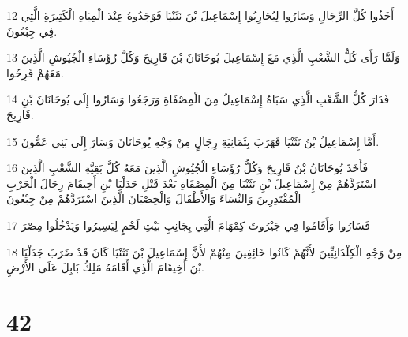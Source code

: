 \par 12 أَخَذُوا كُلَّ الرِّجَالِ وَسَارُوا لِيُحَارِبُوا إِسْمَاعِيلَ بْنَ نَثَنْيَا فَوَجَدُوهُ عِنْدَ الْمِيَاهِ الْكَثِيرَةِ الَّتِي فِي جِبْعُونَ.
\par 13 وَلَمَّا رَأَى كُلُّ الشَّعْبِ الَّذِي مَعَ إِسْمَاعِيلَ يُوحَانَانَ بْنَ قَارِيحَ وَكُلَّ رُؤَسَاءِ الْجُيُوشِ الَّذِينَ مَعَهُمْ فَرِحُوا.
\par 14 فَدَارَ كُلُّ الشَّعْبِ الَّذِي سَبَاهُ إِسْمَاعِيلُ مِنَ الْمِصْفَاةِ وَرَجَعُوا وَسَارُوا إِلَى يُوحَانَانَ بْنِ قَارِيحَ.
\par 15 أَمَّا إِسْمَاعِيلُ بْنُ نَثَنْيَا فَهَرَبَ بِثَمَانِيَةِ رِجَالٍ مِنْ وَجْهِ يُوحَانَانَ وَسَارَ إِلَى بَنِي عَمُّونَ.
\par 16 فَأَخَذَ يُوحَانَانُ بْنُ قَارِيحَ وَكُلُّ رُؤَسَاءِ الْجُيُوشِ الَّذِينَ مَعَهُ كُلَّ بَقِيَّةِ الشَّعْبِ الَّذِينَ اسْتَرَدَّهُمْ مِنْ إِسْمَاعِيلَ بْنِ نَثَنْيَا مِنَ الْمِصْفَاةِ بَعْدَ قَتْلِ جَدَلْيَا بْنِ أَخِيقَامَ رِجَالَ الْحَرْبِ الْمُقْتَدِرِينَ وَالنِّسَاءَ وَالأَطْفَالَ وَالْخِصْيَانَ الَّذِينَ اسْتَرَدَّهُمْ مِنْ جِبْعُونَ
\par 17 فَسَارُوا وَأَقَامُوا فِي جَيْرُوتَ كِمْهَامَ الَّتِي بِجَانِبِ بَيْتِ لَحْمٍ لِيَسِيرُوا وَيَدْخُلُوا مِصْرَ
\par 18 مِنْ وَجْهِ الْكِلْدَانِيِّينَ لأَنَّهُمْ كَانُوا خَائِفِينَ مِنْهُمْ لأَنَّ إِسْمَاعِيلَ بْنَ نَثَنْيَا كَانَ قَدْ ضَرَبَ جَدَلْيَا بْنَ أَخِيقَامَ الَّذِي أَقَامَهُ مَلِكُ بَابِلَ عَلَى الأَرْضِ.

\chapter{42}

